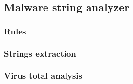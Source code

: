 \subsection{Malware string analyzer} %

\paragraph{}

\subsubsection{Rules} %

\paragraph{}

\subsubsection{Strings extraction} %

\paragraph{}

\subsubsection{Virus total analysis} %

\paragraph{}
